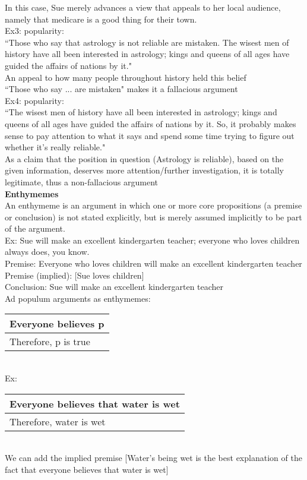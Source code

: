 In this case, Sue merely advances a view that appeals to her local audience, namely that medicare is a good thing for their town.\\

Ex3: popularity:\\
``Those who say that astrology is not reliable are mistaken. The wisest men of history have all been interested in astrology; kings and queens of all ages have guided the affairs of nations by it."\\

An appeal to how many people throughout history held this belief\\
``Those who say ... are mistaken" makes it a fallacious argument\\

Ex4: popularity:\\
``The wisest men of history have all been interested in astrology; kings and queens of all ages have guided the affairs of nations by it. So, it probably makes sense to pay attention to what it says and spend some time trying to figure out whether it's really reliable."\\

As a claim that the position in question (Astrology is reliable), based on the given information, deserves more attention/further investigation, it is totally legitimate, thus a non-fallacious argument\\

\textbf{Enthymemes}\\
An enthymeme is an argument in which one or more core propositions (a premise or conclusion) is not stated explicitly, but is merely assumed implicitly to be part of the argument.\\

Ex: Sue will make an excellent kindergarten teacher; everyone who loves children always does, you know.\\
Premise: Everyone who loves children will make an excellent kindergarten teacher\\
Premise (implied): [Sue loves children]\\
Conclusion: Sue will make an excellent kindergarten teacher\\

Ad populum arguments as enthymemes:\\
\begin{tabular}{p{5cm}}
    Everyone believes p\\
    \hline
    Therefore, p is true
\end{tabular}\\
Ex:\\
\begin{tabular}{p{6cm}}
    Everyone believes that water is wet\\
    \hline
    Therefore, water is wet
\end{tabular}\\
We can add the implied premise [Water's being wet is the best explanation of the fact that everyone believes that water is wet]\\

